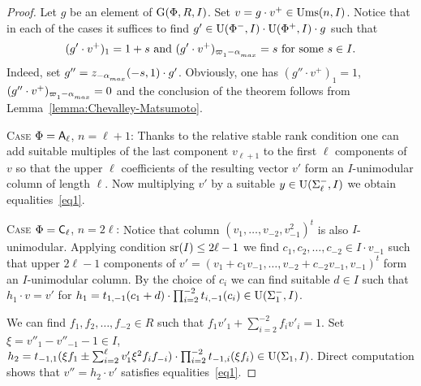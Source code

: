 \begin{proof}

Let $g$ be an element of $\operatorname{G}(\Phi, R, I)$. Set $v=g \cdot v^+\in\operatorname{Ums}(n, I)$. 
Notice that in each of the cases it suffices to find $g' \in \operatorname{U}(\Phi^-, I) \cdot \operatorname{U}(\Phi^+, I) \cdot g$ such that 
\begin{equation} \label{eq1} (g'\cdot v^+)_{1} = 1 + s \text{ and } (g'\cdot v^+)_{\varpi\ssub{1}-\alpha\ssub{max}} = s\ \text{for some}\ s\in I. \end{equation}
Indeed, set $g'' = z_{-\alpha\ssub{max}}(-s, 1) \cdot g'$.
Obviously, one has $(g''\cdot v^+)_1 = 1$, $(g''\cdot v^+)_{\varpi\ssub{1}-\alpha\ssub{max}}=0$ and the conclusion of the theorem follows from Lemma~\ref{lemma:Chevalley-Matsumoto}.

\textsc{Case $\Phi=\mathsf{A}_\ell$, $n=\ell + 1$:}
Thanks to the relative stable rank condition one can add suitable multiples of the last component $v_{\ell+1}$ to the first $\ell$ components of $v$ so that the upper
$\ell$ coefficients of the resulting vector $v'$ form an $I$-unimodular column of length $\ell$.
Now multiplying $v'$ by a suitable $y\in \operatorname{U}(\Sigma_\ell^-, I)$ we obtain equalities~\ref{eq1}.

\textsc{Case $\Phi=\mathsf{C}_\ell$, $n=2\ell$:}
Notice that column $(v_1,\ldots, v_{-2}, v_{-1}^2)^t$ is also $I$-unimodular.
Applying condition $\operatorname{sr}(I)\leq 2\ell-1$ we find $c_1, c_2, \ldots, c_{-2} \in I \cdot v_{-1}$ such that upper $2\ell -1$ components of $v'=(v_1 + c_1 v_{-1}, \ldots, v_{-2} + c_{-2}v_{-1}, v_{-1})^t$ form an $I$-unimodular column.
By the choice of $c_i$ we can find suitable $d\in I$ such that $h_1 \cdot v = v'$ for $h_1 = t_{1,-1}(c_1 + d) \cdot \prod_{i=2}^{-2} t_{i,-1}(c_i) \in \operatorname{U}(\Sigma_1^-, I)$.

We can find $f_1, f_2,\ldots, f_{-2} \in R$ such that $f_1v'_1+\sum_{i=2}^{-2} f_i v'_i = 1$.
Set $\xi = v''_1-v''_{-1}-1 \in I$, $h_2 = t_{-1,1}(\xi f_1 \pm \sum_{i=2}^\ell v_1' \xi^2 f_i f_{-i}) \cdot \prod_{i=2}^{-2} t_{-1,i}(\xi f_i) \in \operatorname{U}(\Sigma_1, I)$.
Direct computation shows that $v'' = h_2 \cdot v'$ satisfies equalities~\ref{eq1}.



\end{proof}

